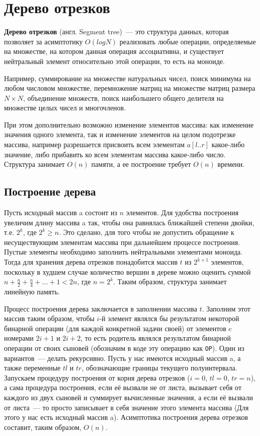 \section{Дерево отрезков}
\textbf{Дерево отрезков} (англ. Segment tree)~--- это структура данных, которая позволяет за асимптотику $O(logN)$
реализовать любые операции, определяемые на множестве, на котором данная операция ассоциативна,
и существует нейтральный элемент относительно этой операции, то есть на моноиде.

Например, суммирование на множестве натуральных чисел, поиск минимума на любом числовом множестве,
перемножение матриц на множестве матриц размера $N \times N$, объединение множеств,
поиск наибольшего общего делителя на множестве целых чисел и многочленов.

При этом дополнительно возможно изменение элементов массива: как изменение значения одного элемента,
так и изменение элементов на целом подотрезке массива, например разрешается присвоить всем элементам $a[l..r]$ какое-либо значение,
либо прибавить ко всем элементам массива какое-либо число.
Структура занимает $O(n)$ памяти, а ее построение требует $O(n)$ времени.

\subsection{Построение дерева}
Пусть исходный массив a состоит из $n$ элементов.
Для удобства построения увеличим длину массива a так, чтобы она равнялась ближайшей степени двойки, т.е. $2^k$, где $2^k \ge n$.
Это сделано, для того чтобы не допустить обращение к несуществующим элементам массива при дальнейшем процессе построения.
Пустые элементы необходимо заполнить нейтральными элементами моноида.
Тогда для хранения дерева отрезков понадобится массив $t$ из $2^{k+1}$ элементов,
поскольку в худшем случае количество вершин в дереве можно оценить суммой $n+\frac{n}{2}+\frac{n}{4}+\ldots+1 < 2n$, где $n=2^k$.
Таким образом, структура занимает линейную память.

Процесс построения дерева заключается в заполнении массива $t$.
Заполним этот массив таким образом, чтобы $i$-й элемент являлся бы результатом некоторой бинарной операции
(для каждой конкретной задачи своей) от элементов c номерами $2i+1$ и $2i+2$,
то есть родитель являлся результатом бинарной операции от своих сыновей (обозначим в коде эту операцию как \texttt{OP}).
Один из вариантов~--- делать рекурсивно.
Пусть у нас имеются исходный массив a, а также переменные $tl$ и $tr$, обозначающие границы текущего полуинтервала.
Запускаем процедуру построения от корня дерева отрезков ($i=0$, $tl=0$, $tr=n$), а сама процедура построения,
если её вызвали не от листа, вызывает себя от каждого из двух сыновей и суммирует вычисленные значения,
а если её вызвали от листа~--- то просто записывает в себя значение этого элемента массива (Для этого у нас есть исходный массив a).
Асимптотика построения дерева отрезков составит, таким образом, $O(n)$.

